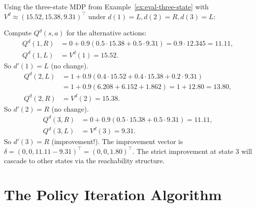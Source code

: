 \documentclass[11pt,a4paper]{article}
\begin{document}
\begin{example}
\label{ex:pi-step}
Using the three-state MDP from Example~\ref{ex:eval-three-state}
with $V^d \approx (15.52, 15.38, 9.31)^\top$ under
$d(1) = L, d(2) = R, d(3) = L$:

Compute $Q^d(s,a)$ for the alternative actions:
\begin{align*}
    Q^d(1, R) &= 0 + 0.9(0.5 \cdot 15.38 + 0.5 \cdot 9.31)
    = 0.9 \cdot 12.345 = 11.11, \\
    Q^d(1, L) &= V^d(1) = 15.52.
\end{align*}
So $d'(1) = L$ (no change).
\begin{align*}
    Q^d(2, L) &= 1 + 0.9(0.4 \cdot 15.52 + 0.4 \cdot 15.38
    + 0.2 \cdot 9.31) \\
    &= 1 + 0.9(6.208 + 6.152 + 1.862) = 1 + 12.80 = 13.80, \\
    Q^d(2, R) &= V^d(2) = 15.38.
\end{align*}
So $d'(2) = R$ (no change).
\begin{align*}
    Q^d(3, R) &= 0 + 0.9(0.5 \cdot 15.38 + 0.5 \cdot 9.31)
    = 11.11, \\
    Q^d(3, L) &= V^d(3) = 9.31.
\end{align*}
So $d'(3) = R$ (improvement!). The improvement vector is
$\delta = (0, 0, 11.11 - 9.31)^\top = (0, 0, 1.80)^\top$.
The strict improvement at state 3 will cascade to other states
via the reachability structure.
\end{example}


\section{The Policy Iteration Algorithm}
\label{sec:pi-algorithm}
\end{document}
